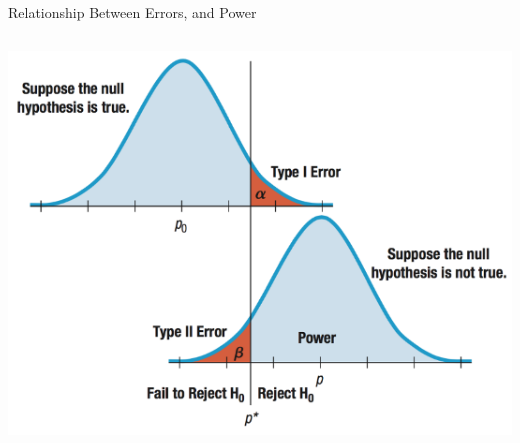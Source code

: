 \documentclass[
  ignorenonframetext,
]{beamer}
\begin{document}
\begin{frame}{Relationship Between Errors, and Power}
\begin{columns}
\begin{column}{0.3\textwidth}
\begin{center}\includegraphics[width=1\linewidth]{week13_3} \end{center}

\end{column}
\end{columns}
\end{frame}
\end{document}
